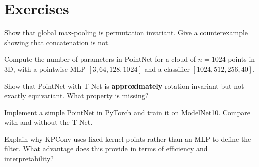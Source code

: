 \section{Exercises}

\begin{exercise}
Show that global max-pooling is permutation invariant. Give a
counterexample showing that concatenation is not.
\end{exercise}

\begin{exercise}
Compute the number of parameters in PointNet for a cloud of
$n = 1024$ points in 3D, with a pointwise MLP
$[3, 64, 128, 1024]$ and a classifier $[1024, 512, 256, 40]$.
\end{exercise}

\begin{exercise}[Equivariance]
Show that PointNet with T-Net is \textbf{approximately}
rotation invariant but not exactly equivariant. What property
is missing?
\end{exercise}

\begin{exercise}[Implementation]
Implement a simple PointNet in PyTorch and train it on ModelNet10.
Compare with and without the T-Net.
\end{exercise}

\begin{exercise}
Explain why KPConv uses fixed kernel points rather than an MLP
to define the filter. What advantage does this provide in terms
of efficiency and interpretability?
\end{exercise}
